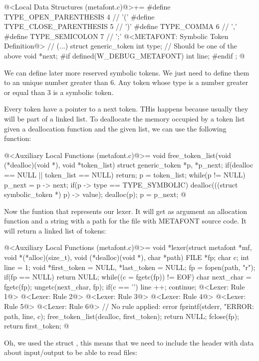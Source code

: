 \iniciocodigo
@<Local Data Structures (metafont.c)@>+=
#define TYPE_OPEN_PARENTHESIS  4 // '('
#define TYPE_CLOSE_PARENTHESIS 5 // ')'
#define TYPE_COMMA             6 // ','
#define TYPE_SEMICOLON         7 // ';'
@<METAFONT: Symbolic Token Definition@>
// (...)
struct generic_token{
  int type;   // Should be one of the above
  void *next;
#if defined(W_DEBUG_METAFONT)
  int line;
#endif
};
@
\fimcodigo

We can define later more reserved symbolic tokens. We just need to
define them to an unique number greater than 6. Any token whose type
is a number greater or equal than 3 is a symbolic token.

Every token have a pointer to a next token. THis happens because
usually they will be part of a linked list. To deallocate the memory
occupied by a token list given a deallocation function and the given
list, we can use the following function:

\iniciocodigo
@<Auxiliary Local Functions (metafont.c)@>=
void free_token_list(void (*dealloc)(void *), void *token_list){
  struct generic_token *p, *p_next;
  if(dealloc == NULL || token_list == NULL)
    return;
  p = token_list;
  while(p != NULL){
    p_next = p -> next;
    if(p -> type == TYPE_SYMBOLIC)
      dealloc(((struct symbolic_token *) p) -> value);
    dealloc(p);
    p = p_next;
  }
}
@
\fimcodigo

Now the funtion that represents our lexer. It will get as argument an
allocation function and a string with a path for the file with
METAFONT source code. It will return a linked list of tokens:

\iniciocodigo
@<Auxiliary Local Functions (metafont.c)@>=
void *lexer(struct metafont *mf, void *(*alloc)(size_t),
            void (*dealloc)(void *), char *path){
  FILE *fp;
  char c;
  int line = 1;
  void *first_token = NULL, *last_token = NULL;
  fp = fopen(path, "r");
  if(fp == NULL)
    return NULL;
  while((c = fgetc(fp)) != EOF){
    char next_char = fgetc(fp);
    ungetc(next_char, fp);
    if(c == '\n'){
      line ++;
      continue;
    }
    @<Lexer: Rule 1@>
    @<Lexer: Rule 2@>
    @<Lexer: Rule 3@>
    @<Lexer: Rule 4@>
    @<Lexer: Rule 5@>
    @<Lexer: Rule 6@>
    // No rule applied: error
    fprintf(stderr, "ERROR: %
            path, line, c);
    free_token_list(dealloc, first_token);
    return NULL;
  }
  fclose(fp);
  return first_token;
}
@
\fimcodigo

Oh, we used the struct , this means that we need to
include the header with data about input/output to be able to read
files:

